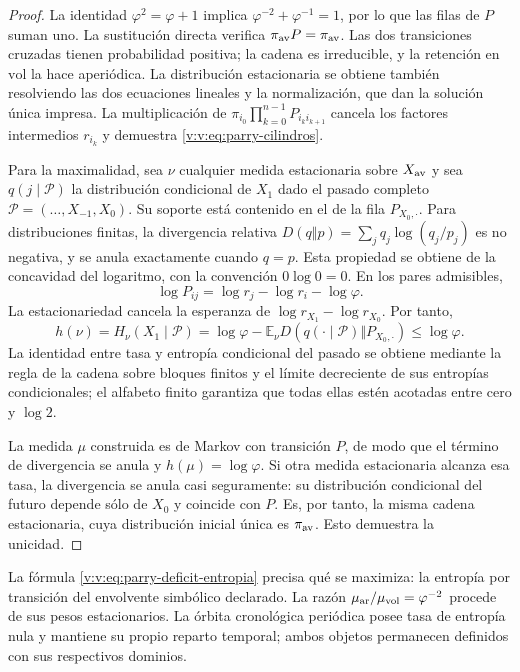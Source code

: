 \begin{proof}
La identidad \(\varphi^2=\varphi+1\) implica
\(\varphi^{-2}+\varphi^{-1}=1\), por lo que las filas de \(P\)
suman uno. La sustitución directa verifica
\(\pi_{\rm av}P=\pi_{\rm av}\). Las dos transiciones cruzadas
tienen probabilidad positiva; la cadena es irreducible, y la retención
en \(\mathrm{vol}\) la hace aperiódica. La distribución estacionaria
se obtiene también resolviendo las dos ecuaciones lineales y la
normalización, que dan la solución única impresa. La multiplicación de
\(\pi_{i_0}\prod_{k=0}^{n-1}P_{i_k i_{k+1}}\) cancela los factores
intermedios \(r_{i_k}\) y demuestra \eqref{v:v:eq:parry-cilindros}.

Para la maximalidad, sea \(\nu\) cualquier medida estacionaria
sobre \(X_{\rm av}\) y sea
\(q(j\mid\mathcal P)\) la distribución condicional de \(X_1\)
dado el pasado completo \(\mathcal P=(\ldots,X_{-1},X_0)\).
Su soporte está contenido en el de la fila \(P_{X_0,\cdot}\).
Para distribuciones finitas, la divergencia relativa
\(D(q\Vert p)=\sum_jq_j\log(q_j/p_j)\) es no negativa, y se
anula exactamente cuando \(q=p\). Esta propiedad se obtiene de
la concavidad del logaritmo, con la convención \(0\log0=0\).
En los pares admisibles,
\[
 \log P_{ij}=\log r_j-\log r_i-\log\varphi.
\]
La estacionariedad cancela la esperanza de
\(\log r_{X_1}-\log r_{X_0}\). Por tanto,
\begin{equation}
 h(\nu)=H_\nu(X_1\mid\mathcal P)
 =\log\varphi-
 \mathbb E_\nu D\!\left(q(\cdot\mid\mathcal P)
                  \Vert P_{X_0,\cdot}\right)
 \leq\log\varphi.
 \label{v:v:eq:parry-deficit-entropia}
\end{equation}
La identidad entre tasa y entropía condicional del pasado se obtiene
mediante la regla de la cadena sobre bloques finitos y el límite
decreciente de sus entropías condicionales; el alfabeto finito garantiza
que todas ellas estén acotadas entre cero y \(\log2\).

La medida \(\mu\) construida es de Markov con transición \(P\),
de modo que el término de divergencia se anula y
\(h(\mu)=\log\varphi\). Si otra medida estacionaria alcanza
esa tasa, la divergencia se anula casi seguramente: su distribución
condicional del futuro depende sólo de \(X_0\) y coincide con \(P\).
Es, por tanto, la misma cadena estacionaria, cuya distribución inicial
única es \(\pi_{\rm av}\). Esto demuestra la unicidad.
\end{proof}

La fórmula \eqref{v:v:eq:parry-deficit-entropia} precisa qué se maximiza:
la entropía por transición del envolvente simbólico declarado. La razón
\(\mu_{\rm ar}/\mu_{\rm vol}=\varphi^{-2}\) procede de sus pesos
estacionarios. La órbita cronológica periódica posee tasa de entropía
nula y mantiene su propio reparto temporal; ambos objetos permanecen
definidos con sus respectivos dominios.
